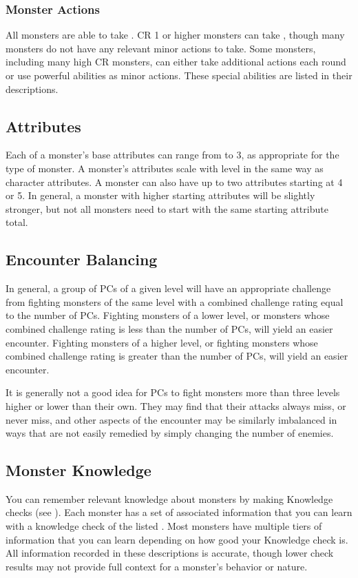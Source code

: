         \subsubsection{Monster Actions}
            All monsters are able to take .
            CR 1 or higher monsters can take , though many monsters do not have any relevant minor actions to take.
            Some monsters, including many high CR monsters, can either take additional actions each round or use powerful abilities as minor actions.
            These special abilities are listed in their descriptions.

    \subsection{Attributes}
        Each of a monster's base attributes can range from  to 3, as appropriate for the type of monster.
        A monster's attributes scale with level in the same way as character attributes.
        A monster can also have up to two attributes starting at 4 or 5.
        In general, a monster with higher starting attributes will be slightly stronger, but not all monsters need to start with the same starting attribute total.

    \subsection{Encounter Balancing}\label{Encounter Balancing}
        In general, a group of PCs of a given level will have an appropriate challenge from fighting monsters of the same level with a combined challenge rating equal to the number of PCs.
        Fighting monsters of a lower level, or monsters whose combined challenge rating is less than the number of PCs, will yield an easier encounter.
        Fighting monsters of a higher level, or fighting monsters whose combined challenge rating is greater than the number of PCs, will yield an easier encounter.

        It is generally not a good idea for PCs to fight monsters more than three levels higher or lower than their own.
        They may find that their attacks always miss, or never miss, and other aspects of the encounter may be similarly imbalanced in ways that are not easily remedied by simply changing the number of enemies.

    \subsection{Monster Knowledge}
        You can remember relevant knowledge about monsters by making Knowledge checks (see ).
        Each monster has a set of associated information that you can learn with a knowledge check of the listed .
        Most monsters have multiple tiers of information that you can learn depending on how good your Knowledge check is.
        All information recorded in these descriptions is accurate, though lower check results may not provide full context for a monster's behavior or nature.


